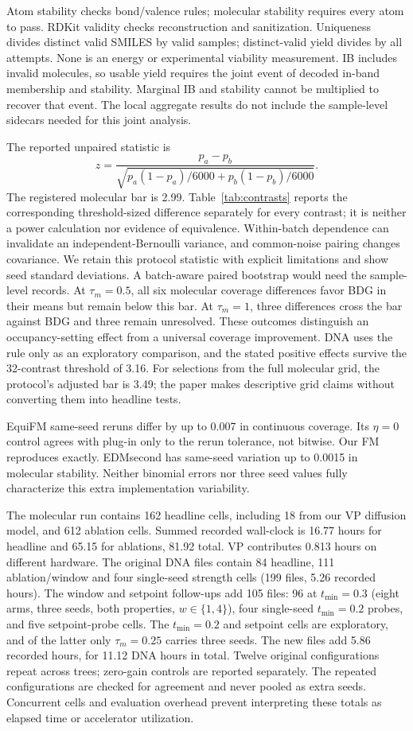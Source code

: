 \documentclass{article}
\begin{document}
Atom stability checks bond/valence rules; molecular stability requires every atom to pass. RDKit validity checks reconstruction and sanitization. Uniqueness divides distinct valid SMILES by valid samples; distinct-valid yield divides by all attempts. None is an energy or experimental viability measurement. IB includes invalid molecules, so usable yield requires the joint event of decoded in-band membership and stability. Marginal IB and stability cannot be multiplied to recover that event. The local aggregate results do not include the sample-level sidecars needed for this joint analysis.

The reported unpaired statistic is
\[
 z=\frac{p_a-p_b}{\sqrt{p_a(1-p_a)/6000+p_b(1-p_b)/6000}}.
\]
The registered molecular bar is 2.99. Table~\ref{tab:contrasts} reports the corresponding threshold-sized difference separately for every contrast; it is neither a power calculation nor evidence of equivalence. Within-batch dependence can invalidate an independent-Bernoulli variance, and common-noise pairing changes covariance. We retain this protocol statistic with explicit limitations and show seed standard deviations. A batch-aware paired bootstrap would need the sample-level records. At $\tau_m=0.5$, all six molecular coverage differences favor BDG in their means but remain below this bar. At $\tau_m=1$, three differences cross the bar against BDG and three remain unresolved. These outcomes distinguish an occupancy-setting effect from a universal coverage improvement. DNA uses the rule only as an exploratory comparison, and the stated positive effects survive the 32-contrast threshold of 3.16. For selections from the full molecular grid, the protocol's adjusted bar is 3.49; the paper makes descriptive grid claims without converting them into headline tests.

EquiFM same-seed reruns differ by up to 0.007 in continuous coverage. Its $\eta=0$ control agrees with plug-in only to the rerun tolerance, not bitwise. Our FM reproduces exactly. EDMsecond has same-seed variation up to 0.0015 in molecular stability. Neither binomial errors nor three seed values fully characterize this extra implementation variability.

The molecular run contains 162 headline cells, including 18 from our VP diffusion model, and 612 ablation cells. Summed recorded wall-clock is 16.77 hours for headline and 65.15 for ablations, 81.92 total. VP contributes 0.813 hours on different hardware. The original DNA files contain 84 headline, 111 ablation/window and four single-seed strength cells (199 files, 5.26 recorded hours). The window and setpoint follow-ups add 105 files: 96 at $t_{\min}=0.3$ (eight arms, three seeds, both properties, $w\in\{1,4\}$), four single-seed $t_{\min}=0.2$ probes, and five setpoint-probe cells. The $t_{\min}=0.2$ and setpoint cells are exploratory, and of the latter only $\tau_m=0.25$ carries three seeds. The new files add 5.86 recorded hours, for 11.12 DNA hours in total. Twelve original configurations repeat across trees; zero-gain controls are reported separately. The repeated configurations are checked for agreement and never pooled as extra seeds. Concurrent cells and evaluation overhead prevent interpreting these totals as elapsed time or accelerator utilization.
\end{document}
